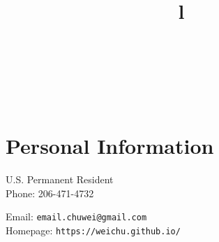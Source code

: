 \documentclass[line,10pt,final]{res}
\begin{document}


\begin{resume}


\begin{format}
\title{l}\\
\\
\body\\
\end{format}

\singlespace

\section{\sc Personal Information}
\vskip 0.2cm

\begin{minipage}{1.15\linewidth}
  \begin{minipage}{0.35\linewidth}
    U.S. Permanent Resident \\
    Phone: 206-471-4732\\
  \end{minipage}
  \hspace{\fill}
  \begin{minipage}{0.75\linewidth}
    Email: {\tt email.chuwei@gmail.com} \\
    Homepage: {\tt https://weichu.github.io/} \\
  \end{minipage}
\end{minipage}


\end{resume}
\end{document}
